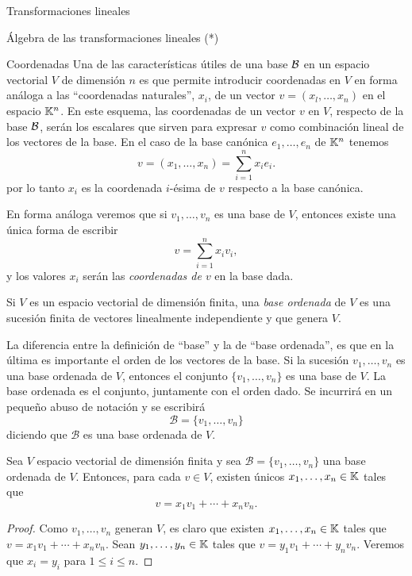 \begin{chapter}{Transformaciones lineales}
\begin{section}{\'Algebra de las transformaciones lineales (*)}
    

        \end{section}




        


    \begin{section}{Coordenadas}\label{seccion-coordenadas}
        Una de las características útiles de una base $\mathcal{B}$ en un espacio vectorial  $V$ de dimensión $n$ es que permite introducir coordenadas en $V$ en forma análoga a las ``coordenadas naturales'', $x_i$, de un vector $v = (x_l,\ldots, x_n)$ en el espacio $\mathbb K^n$. En este esquema, las coordenadas de un vector $v$ en $V$, respecto de la base $\mathcal{B}$, serán los escalares que sirven para expresar $v$ como combinación lineal de los vectores de la base. En  el caso  de la base canónica $e_1,\ldots,e_n$ de $\mathbb K^n$ tenemos
        $$
        v = (x_1,\ldots,x_n) = \sum_{i=1}^{n} x_ie_i.
        $$
        por lo tanto $x_i$  es la coordenada $i$-ésima de $v$ respecto a la base canónica. 
        
        En  forma análoga veremos que si $v_1,\ldots,v_n$  es una base de $V$,  entonces existe una única forma de  escribir 
        $$
        v =  \sum_{i=1}^{n} x_iv_i,
        $$ 
        y los valores  $x_i$  serán las \textit{coordenadas de $v$} en la base dada. 
        
        \begin{definicion}
            Si $V$ es un espacio vectorial de dimensión finita, una \textit{base ordenada} de $V$ es una sucesión finita de vectores linealmente independiente y que genera $V$.
        \end{definicion}
        
        
        La diferencia entre la definición de ``base'' y la de ``base ordenada'',  es que en la última es  importante el orden de los vectores de la base. Si la sucesión $v_1,\ldots,v_n$ es una base ordenada de $V$, entonces el conjunto $\{v_1,\ldots,v_n\}$ es una base de $V$. La base ordenada es el conjunto, juntamente con el orden dado. Se incurrirá en un pequeño abuso de notación y se escribirá
        $$
        \mathcal{B} = \{v_1,\ldots,v_n\}
        $$
        diciendo que $\mathcal{B}$ es una base ordenada de $V$.
        
        \begin{proposicion}
            Sea $V$  espacio vectorial de dimensión finita y sea $\mathcal{B} = \{v_1,\ldots,v_n\}$ una base ordenada de $V$. Entonces, para cada $v \in V$,  existen únicos $x_1,\ldots,x_n \in \mathbb K$ tales que $$v =   x_1v_1 + \cdots +x_nv_n.$$
        \end{proposicion}
        \begin{proof}
            Como $v_1,\ldots,v_n$  generan $V$,  es claro que existen $x_1,\ldots,x_n \in \mathbb K$ tales que $v =   x_1v_1 + \cdots +x_nv_n$. Sean $y_1,\ldots,y_n \in \mathbb K$ tales que $v =   y_1v_1 + \cdots +y_nv_n$. Veremos que $x_i = y_i$ para $1 \le i \le n$.
            

\end{proof}
\end{section}
\end{chapter}
